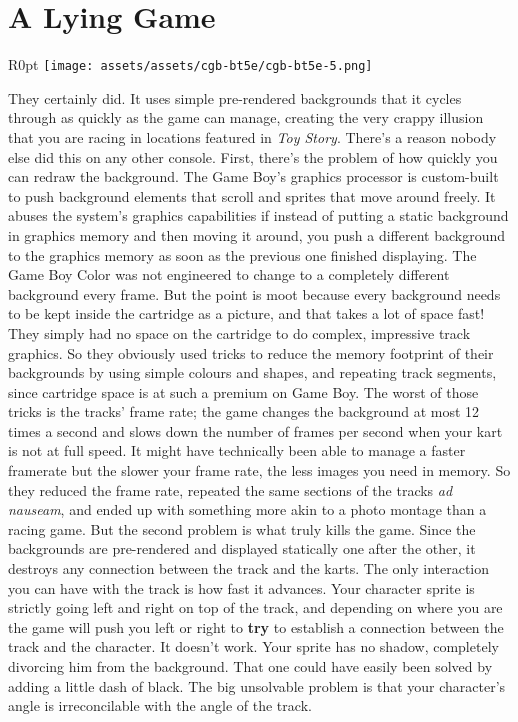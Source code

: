 \documentclass{book}
\begin{document}
\FloatBarrier\needspace{10mm}\section*{A Lying Game}\nopagebreak[4]

\begin{wrapfigure}{R}{0pt} \texttt{[image: assets/assets/cgb-bt5e/cgb-bt5e-5.png]}\end{wrapfigure}
They certainly did. It uses simple pre-rendered backgrounds that it cycles through as quickly as the game can manage, creating the very crappy illusion that you are racing in locations featured in \emph{Toy Story}. There’s a reason nobody else did this on any other console. First, there’s the problem of how quickly you can redraw the background. The Game Boy’s graphics processor is custom-built to push background elements that scroll and sprites that move around freely. It abuses the system’s graphics capabilities if instead of putting a static background in graphics memory and then moving it around, you push a different background to the graphics memory as soon as the previous one finished displaying. The Game Boy Color was not engineered to change to a completely different background every frame. But the point is moot because every background needs to be kept inside the cartridge as a picture, and that takes a lot of space fast! They simply had no space on the cartridge to do complex, impressive track graphics. So they obviously used tricks to reduce the memory footprint of their backgrounds by using simple colours and shapes, and repeating track segments, since cartridge space is at such a premium on Game Boy. The worst of those tricks is the tracks’ frame rate; the game changes the background at most 12 times a second and slows down the number of frames per second when your kart is not at full speed. It might have technically been able to manage a faster framerate but the slower your frame rate, the less images you need in memory. So they reduced the frame rate, repeated the same sections of the tracks \emph{ad nauseam}, and ended up with something more akin to a photo montage than a racing game. But the second problem is what truly kills the game. Since the backgrounds are pre-rendered and displayed statically one after the other, it destroys any connection between the track and the karts. The only interaction you can have with the track is how fast it advances. Your character sprite is strictly going left and right on top of the track, and depending on where you are the game will push you left or right to \textbf{try} to establish a connection between the track and the character. It doesn’t work. Your sprite has no shadow, completely divorcing him from the background. That one could have easily been solved by adding a little dash of black. The big unsolvable problem is that your character’s angle is irreconcilable with the angle of the track.
\end{document}

